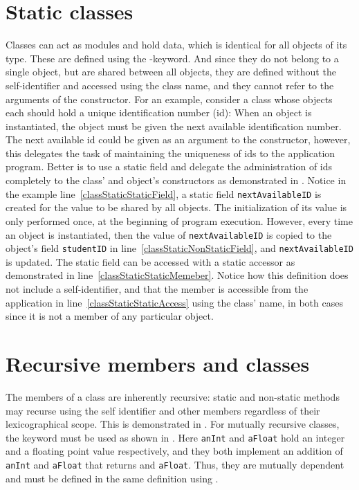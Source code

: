 \section{Static classes}
Classes can act as modules and hold data, which is identical for all objects of its type. These are defined using the -keyword. And since they do not belong to a single object, but are shared between all objects, they are defined without the self-identifier and accessed using the class name, and they cannot refer to the arguments of the constructor. For an example, consider a class whose objects each should hold a unique identification number (id): When an object is instantiated, the object must be given the next available identification number. The next available id could be given as an argument to the constructor, however, this delegates the task of maintaining the uniqueness of ids to the application program. Better is to use a static field and delegate the administration of ids completely to the class' and object's constructors as demonstrated in .
%
%
Notice in the example line~\ref{classStaticStaticField}, a static field \lstinline{nextAvailableID} is created for the value to be shared by all objects. The initialization of its value is only performed once, at the beginning of program execution. However, every time an object is instantiated, then the value of \lstinline{nextAvailableID} is copied to the object's field \lstinline{studentID} in line~\ref{classStaticNonStaticField}, and \lstinline{nextAvailableID} is updated. The static field can be accessed with a static accessor as demonstrated in line~\ref{classStaticStaticMemeber}. Notice how this definition does not include a self-identifier, and that the member is accessible from the application in line~\ref{classStaticStaticAccess} using the class' name, in both cases since it is not a member of any particular object.

\section{Recursive members and classes}
The members of a class are inherently recursive: static and non-static methods may recurse using the self identifier and other members regardless of their lexicographical scope. This is demonstrated in .
%
%
For mutually recursive classes, the keyword  must be used as shown in .
%
%
Here \lstinline{anInt} and \lstinline{aFloat} hold an integer and a floating point value respectively, and they both implement an addition of \lstinline{anInt} and \lstinline{aFloat} that returns and \lstinline{aFloat}. Thus, they are mutually dependent and must be defined in the same  definition using .

